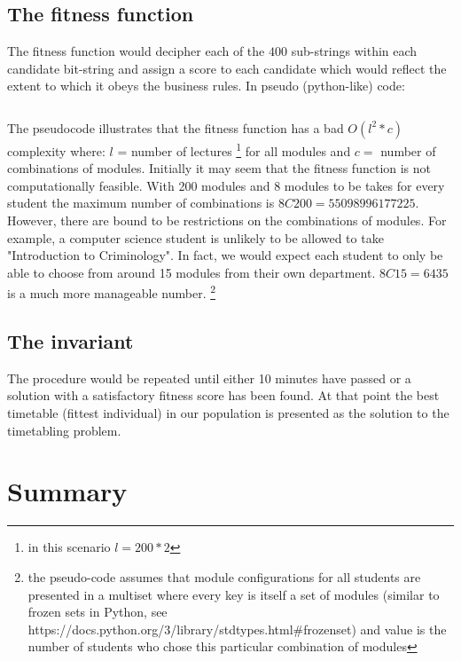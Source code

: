 \documentclass[a4paper, 12pt, titlepage]{article}
\begin{document}
\subsection*{The fitness function}

The fitness function would decipher each of the \(400\) sub-strings within each
candidate bit-string and assign a score to each candidate which would reflect
the extent to which it obeys the business rules. In pseudo (python-like) code: 

\inputminted{python}{fitness.py}

The pseudocode illustrates that the fitness function has a bad \(O(l^2 *
c)\) complexity where: \(l\) = number of lectures \footnote{in this
scenario \(l = 200 * 2\)} for all modules and \( c = \) number of
combinations of modules.  Initially it may seem that the fitness function
is not computationally feasible.  With 200 modules and 8 modules to be
takes for every student the maximum number of combinations is \(8C200 =
55098996177225\). However, there are bound to be restrictions on the
combinations of modules. For example, a computer science student is
unlikely to be allowed to take "Introduction to Criminology". In fact, we
would expect each student to only be able to choose from around 15 modules
from their own department. \(8C15 = 6435\) is a much more manageable number.
\footnote{the pseudo-code assumes that module configurations for all students are presented
in a multiset where every key is itself a set of modules (similar to frozen sets in
Python, see https://docs.python.org/3/library/stdtypes.html#frozenset)
and value is the number of students who chose this particular combination of modules}

\subsection*{The invariant}

The procedure would be repeated until either 10 minutes have passed or a
solution with a satisfactory fitness score has been found.  At that point
the best timetable (fittest individual) in our population is presented
as the solution to the timetabling problem.


\section*{Summary}
\end{document}
